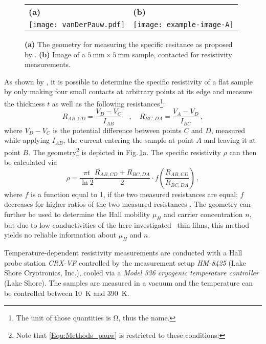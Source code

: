 \begin{figure}
    \centering
    \begin{tabular}{ll}
        \textbf{(a)} & \textbf{(b)} \\
        \texttt{[image: vanDerPauw.pdf]}
        & \texttt{[image: example-image-A]}
    \end{tabular}
    \caption{\textbf{(a)} The geometry for measuring the specific resitance as proposed by \textcite{pauw1958}. \textbf{(b)} Image of a $\qty{5}{\mm}\times\qty{5}{\mm}$ sample, contacted for resistivity measurements. \tbd}
    \label{Fig:Methods_pauwGeometry}
\end{figure}

As shown by \textcite{pauw1958}, it is possible to determine the specific resistivity of a flat sample by only making four small contacts at arbitrary points at its edge and measure the thickness $t$ as well as the following resistances\footnote{
    The unit of those quantities is \unit{\ohm}, thus the name.
}:
\begin{equation}
    R_{AB,CD}=\frac{V_D-V_C}{I_{AB}}\quad , \quad
    R_{BC,DA}=\frac{V_A-V_D}{I_{BC}}\,,
\end{equation}
where $V_D-V_C$ is the potential difference between points $C$ and $D$, measured while applying $I_{AB}$, the current entering the sample at point $A$ and leaving it at point $B$.
The geometry\footnote{
    Note that \eqref{Equ:Methods_pauw} is restricted to these conditions:
} is depicted in Fig.\,\ref{Fig:Methods_pauwGeometry}a.
The specific resistivity $\rho$ can then be calculated via
\begin{equation}
    \label{Equ:Methods_pauw}
    \rho=
    \frac{\pi t}{\ln2}
    \frac{R_{AB,CD}+R_{BC,DA}}{2}
    \cdot f\left(\frac{R_{AB,CD}}{R_{BC,DA}}\right)\,,
\end{equation}
where $f$ is a function equal to 1, if the two measured resistances are equal; $f$ decreases for higher ratios of the two measured resistances
    \cite{pauw1958}.
The geometry can further be used to determine the Hall mobility $\mu_H$ and carrier concentration $n$, but due to low conductivities of the here investigated \cro\ thin films, this method yields no reliable information about $\mu_H$ and $n$.

Temperature-dependent resistivity measurements are conducted with a Hall probe station \textit{CRX-VF} controlled by the measurement setup \textit{HM-8425} (Lake Shore Cryotronics, Inc.), cooled via a \textit{Model 336 cryogenic temperature controller} (Lake Shore).
The samples are measured in a vacuum and the temperature can be controlled between \qty{10}{\kelvin} and \qty{390}{\kelvin}.
